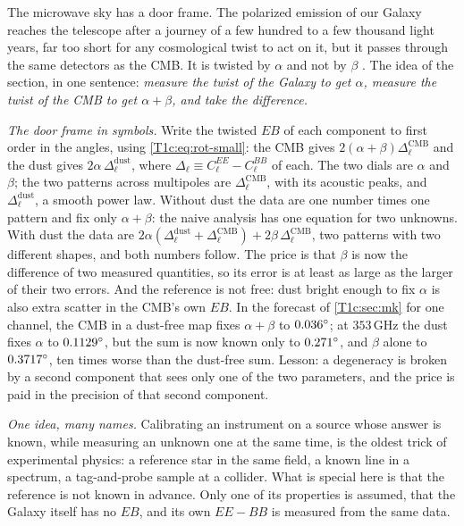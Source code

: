 The microwave sky has a door frame. The polarized emission of our Galaxy reaches the telescope after a journey of a few hundred to a few thousand light years, far too short for any cosmological twist to act on it, but it passes through the same detectors as the CMB. It is twisted by $\alpha$ and not by $\beta$ \cite{Minami2019}. The idea of the section, in one sentence: \emph{measure the twist of the Galaxy to get $\alpha$, measure the twist of the CMB to get $\alpha+\beta$, and take the difference.}

\emph{The door frame in symbols.} Write the twisted $EB$ of each component to first order in the angles, using \eqref{T1c:eq:rot-small}: the CMB gives $2(\alpha+\beta)\Delta^{\mathrm{CMB}}_\ell$ and the dust gives $2\alpha\,\Delta^{\mathrm{dust}}_\ell$, where $\Delta_\ell\equiv C^{EE}_\ell-C^{BB}_\ell$ of each. The two dials are $\alpha$ and $\beta$; the two patterns across multipoles are $\Delta^{\mathrm{CMB}}_\ell$, with its acoustic peaks, and $\Delta^{\mathrm{dust}}_\ell$, a smooth power law. Without dust the data are one number times one pattern and fix only $\alpha+\beta$: the naive analysis has one equation for two unknowns. With dust the data are $2\alpha(\Delta^{\mathrm{dust}}_\ell+\Delta^{\mathrm{CMB}}_\ell)+2\beta\,\Delta^{\mathrm{CMB}}_\ell$, two patterns with two different shapes, and both numbers follow. The price is that $\beta$ is now the difference of two measured quantities, so its error is at least as large as the larger of their two errors. And the reference is not free: dust bright enough to fix $\alpha$ is also extra scatter in the CMB's own $EB$. In the forecast of \cref{T1c:sec:mk} for one channel, the CMB in a dust-free map fixes $\alpha+\beta$ to $0.036^\circ$; at $353\,$GHz the dust fixes $\alpha$ to $0.1129^\circ$, but the sum is now known only to $0.271^\circ$, and $\beta$ alone to $0.3717^\circ$, ten times worse than the dust-free sum. Lesson: a degeneracy is broken by a second component that sees only one of the two parameters, and the price is paid in the precision of that second component.

\emph{One idea, many names.} Calibrating an instrument on a source whose answer is known, while measuring an unknown one at the same time, is the oldest trick of experimental physics: a reference star in the same field, a known line in a spectrum, a tag-and-probe sample at a collider. What is special here is that the reference is not known in advance. Only one of its properties is assumed, that the Galaxy itself has no $EB$, and its own $EE-BB$ is measured from the same data.

